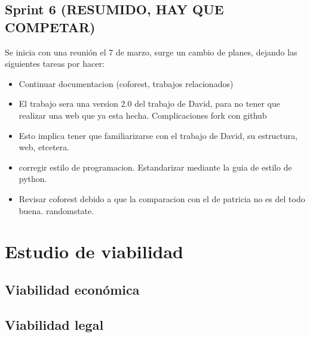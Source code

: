\subsection{Sprint 6 (RESUMIDO, HAY QUE COMPETAR)}
Se inicia con una reunión el 7 de marzo, surge un cambio de planes, dejando las siguientes tareas por hacer:
\begin{itemize}
	\item Continuar documentacion (coforest, trabajos relacionados)
	\item El trabajo sera una version 2.0 del trabajo de David, para no tener que realizar una web que ya esta hecha. Complicaciones fork con github
	\item Esto implica tener que familiarizarse con el trabajo de David, su estructura, web, etcetera.
	\item corregir estilo de programacion. Estandarizar mediante la guia de estilo de python.
	\item Revisar coforest debido a que la comparacion con el de patricia no es del todo buena. randomstate.
	
\end{itemize} 

\section{Estudio de viabilidad}

\subsection{Viabilidad económica}

\subsection{Viabilidad legal}


